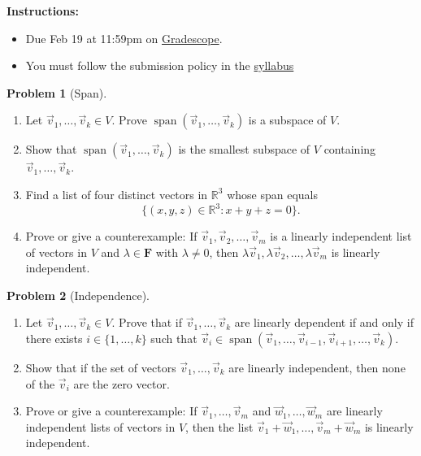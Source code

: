 \documentclass[12pt]{article}
\theoremstyle{definition}
\newtheorem{problem}{Problem}
\begin{document}
\textbf{\Large{}}
    
\vspace{-1.8em}
\hrulefill

\textbf{Instructions:}
    \begin{itemize}
        \item Due Feb 19 at 11:59pm on \href{https://www.gradescope.com/courses/709136}{Gradescope}.
        \item You must follow the submission policy in the \href{https://courses.chen.pw/la_s2024/syllabus.html}{syllabus} 
\end{itemize}
   
\vspace{.5em}

\begin{problem}[Span]~
\begin{enumerate}
\item Let $\vec{v}_1, \ldots, \vec{v}_k \in V$. Prove $\operatorname{span}(\vec{v}_1, \ldots, \vec{v}_k)$ is a subspace of $V$.

\item Show that $\operatorname{span}(\vec{v}_1, \ldots, \vec{v}_k)$ is the smallest subspace of $V$ containing $\vec{v}_1, \ldots, \vec{v}_k$.

\item Find a list of four distinct vectors in $\mathbb{R}^3$ whose span equals 
\[ \{ (x,y,z) \in \mathbb{R}^3 : x+y+z = 0\}. \]

\item Prove or give a counterexample: If $\vec{v}_1, \vec{v}_2, \ldots, \vec{v}_m$ is a linearly independent list of vectors in $V$ and $\lambda \in \mathbf{F}$ with $\lambda \neq 0$, then $\lambda \vec{v}_1, \lambda \vec{v}_2, \ldots, \lambda \vec{v}_m$ is linearly independent.
\end{enumerate}
\end{problem}

\begin{problem}[Independence]~
\begin{enumerate}
    \item Let $\vec{v}_1, \ldots, \vec{v}_k \in V$. Prove that if $\vec{v}_1, \ldots, \vec{v}_k$ are linearly dependent if and only if there exists $i \in \{1, \ldots, k\}$ such that $\vec{v}_i \in \operatorname{span}(\vec{v}_1, \ldots, \vec{v}_{i-1}, \vec{v}_{i+1}, \ldots, \vec{v}_k)$.
    
    \item Show that if the set of vectors $\vec{v}_1, \ldots, \vec{v}_k$ are linearly independent, then none of the $\vec{v}_i$ are the zero vector.
    
    \item Prove or give a counterexample: If $\vec{v}_1, \ldots, \vec{v}_m$ and $\vec{w}_1, \ldots, \vec{w}_m$ are linearly independent lists of vectors in $V$, then the list $\vec{v}_1+\vec{w}_1, \ldots, \vec{v}_m+\vec{w}_m$ is linearly independent.
    \end{enumerate}
\end{problem}
\end{document}
